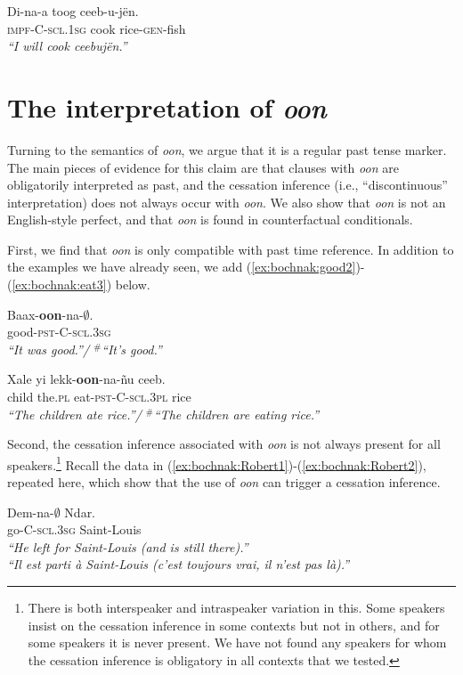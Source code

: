 \documentclass[output=paper]{langsci/langsci}
\begin{document}
\ea
\gll Di-na-a toog ceeb-u-j\"en.\\
\textsc{impf}-C-\textsc{scl.1sg}  cook rice-\textsc{gen}-fish\\
\glt \textit{``I will cook ceebuj\"en.''}\label{ex:bochnak:future1}
\z


\section{The interpretation of \textit{oon}}

Turning to the semantics of \textit{oon}, we argue that it is a
regular past tense marker. The main pieces of evidence for this claim are that clauses with \textit{oon} are obligatorily interpreted as
past, and the cessation inference (i.e., ``discontinuous'' interpretation) does not always occur with \textit{oon}. We also show that
\textit{oon} is not an English-style perfect, and that \textit{oon} is
found in counterfactual conditionals.

First, we find that \textit{oon} is only compatible with past time reference. In addition to the examples we have already seen, we add (\ref{ex:bochnak:good2})-(\ref{ex:bochnak:eat3}) below.

\ea
\gll Baax-\textbf{oon}-na-$\emptyset$.\\
good-\textsc{pst}-C-\textsc{scl.3sg}\\
\glt \textit{``It was good.''/ $^{\#}$``It's good.''}\label{ex:bochnak:good2}
\z

\ea
\gll Xale yi lekk-\textbf{oon}-na-\~nu ceeb.\\
child the.\textsc{pl} eat-\textsc{pst}-C-\textsc{scl.3pl} rice\\
\glt \textit{``The children ate rice.''/ $^{\#}$``The children are eating
  rice.''}\label{ex:bochnak:eat3}
\z

Second, the cessation inference associated with \textit{oon} is not
always present for all speakers.\footnote{There is both interspeaker
  and intraspeaker variation in this. Some speakers insist on the
  cessation inference in some contexts but not in others, and for some
  speakers it is never present. We have not found any speakers for
  whom the cessation inference is obligatory in all contexts that we tested.} Recall the data in (\ref{ex:bochnak:Robert1})-(\ref{ex:bochnak:Robert2}), repeated here, which show that the use of \textit{oon} can
trigger a cessation inference.

\ea
\gll\label{leave1-rep}Dem-na-$\emptyset$ Ndar.\\
go-C-\textsc{scl.3sg} Saint-Louis\\
\glt \textit{``He left for Saint-Louis (and is still there).''}\\\textit{``Il est parti \`a Saint-Louis (c'est toujours vrai, il n'est
  pas l\`a).''} \hfill \citep[p.~279]{robert91approche}
\z
\end{document}
